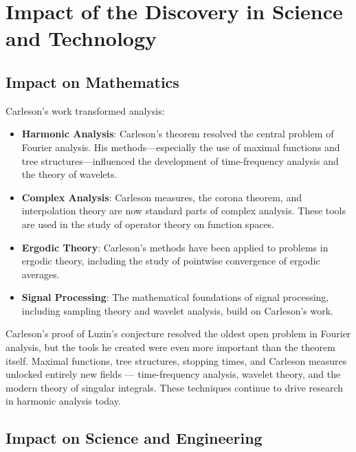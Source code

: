\section{Impact of the Discovery in Science and Technology}

\subsection{Impact on Mathematics}

Carleson's work transformed analysis:

\begin{itemize}
\item \textbf{Harmonic Analysis}: Carleson's theorem resolved the central problem of Fourier analysis. His methods---especially the use of maximal functions and tree structures---influenced the development of time-frequency analysis and the theory of wavelets.

\item \textbf{Complex Analysis}: Carleson measures, the corona theorem, and interpolation theory are now standard parts of complex analysis. These tools are used in the study of operator theory on function spaces.

\item \textbf{Ergodic Theory}: Carleson's methods have been applied to problems in ergodic theory, including the study of pointwise convergence of ergodic averages.

\item \textbf{Signal Processing}: The mathematical foundations of signal processing, including sampling theory and wavelet analysis, build on Carleson's work.
\end{itemize}

\begin{whyitmatters}
Carleson's proof of Luzin's conjecture resolved the oldest open problem in Fourier analysis, but the tools he created were even more important than the theorem itself. Maximal functions, tree structures, stopping times, and Carleson measures unlocked entirely new fields --- time-frequency analysis, wavelet theory, and the modern theory of singular integrals. These techniques continue to drive research in harmonic analysis today.
\end{whyitmatters}

\subsection{Impact on Science and Engineering}

